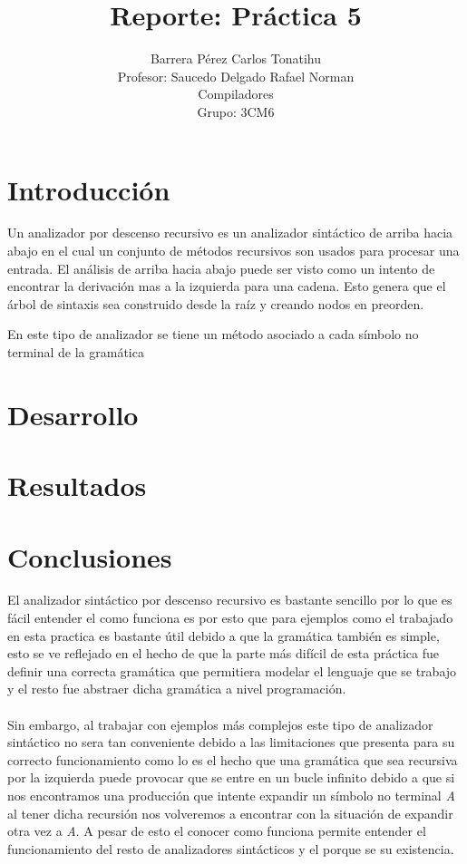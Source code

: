 \documentclass[12pt, titlepage]{article}
\title{Reporte: Práctica 5}
\author{Barrera Pérez Carlos Tonatihu \\ Profesor: Saucedo Delgado Rafael 
Norman 
\\ Compiladores \\ Grupo: 3CM6}
\begin{document}
\maketitle
\tableofcontents
\newpage
\section{Introducción}
Un analizador por descenso recursivo es un analizador sintáctico de arriba hacia abajo en el cual un conjunto de métodos recursivos son usados para procesar una entrada.
El análisis de arriba hacia abajo puede ser visto como un intento de encontrar la derivación mas a la izquierda para una cadena.
Esto genera que el árbol de sintaxis sea construido desde la raíz y creando nodos en preorden. \cite{compis}

En este tipo de analizador se tiene un método asociado a cada símbolo no terminal de la gramática
\section{Desarrollo}
\section{Resultados}
\newpage
\section{Conclusiones}
El analizador sintáctico por descenso recursivo es bastante sencillo por lo que 
es fácil entender el como funciona es por esto que para ejemplos como el 
trabajado en esta 
practica es bastante útil debido a que la gramática también es simple, esto se 
ve 
reflejado en el hecho de que la parte más difícil de esta práctica fue definir 
una correcta gramática que permitiera modelar el lenguaje que se trabajo y el 
resto fue abstraer dicha gramática a nivel programación.
\\\\
Sin embargo, al trabajar con ejemplos más complejos este tipo de analizador 
sintáctico no sera tan conveniente debido a las limitaciones que presenta para 
su correcto funcionamiento como lo es el hecho que una gramática que sea 
recursiva por la izquierda puede provocar que se entre en un bucle infinito 
debido a que si nos encontramos una producción que intente expandir un símbolo 
no terminal \emph{A} al tener dicha recursión nos volveremos a encontrar con la 
situación de expandir otra vez a \emph{A}.
A pesar de esto el conocer como funciona permite entender el funcionamiento del 
resto de analizadores sintácticos y el porque se su existencia.
 

\end{document}
